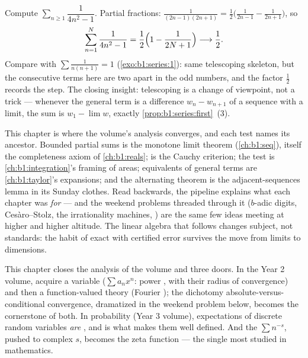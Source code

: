 \begin{example}\label{ex:b1:series:oddtelescope}
Compute $\sum_{n \geq 1} \dfrac{1}{4n^2 - 1}$. Partial
fractions: $\frac{1}{(2n-1)(2n+1)} =
\frac12\bigl(\frac{1}{2n-1} - \frac{1}{2n+1}\bigr)$, so
\[
\sum_{n=1}^{N} \frac{1}{4n^2 - 1}
= \frac12\Bigl(1 - \frac{1}{2N+1}\Bigr)
\longrightarrow \frac12 .
\]
Compare with $\sum \frac{1}{n(n+1)} = 1$
(\cref{exo:b1:series:1}): same telescoping skeleton, but the
consecutive terms here are two apart in the odd numbers, and
the factor $\frac12$ records the step. The closing insight:
telescoping is a change of viewpoint, not a trick --- whenever
the general term is a difference $w_n - w_{n+1}$ of a sequence
with a limit, the sum is $w_1 - \lim w$, exactly
\cref{prop:b1:series:first}~(3).
\end{example}

\begin{remark}
This chapter is where the volume's analysis converges, and each
test names its ancestor. Bounded partial sums is the monotone
limit theorem (\cref{ch:b1:seq}), itself the completeness axiom
of \cref{ch:b1:reals};  is the Cauchy
criterion; the  test is \cref{ch:b1:integration}'s
framing of areas; equivalents of general terms are
\cref{ch:b1:taylor}'s expansions; and the alternating theorem is
the adjacent-sequences lemma in its Sunday clothes. Read
backwards, the pipeline explains what each chapter was
\emph{for} --- and the weekend problems threaded through it
($b$-adic digits, Ces\`aro--Stolz, the irrationality machines,
) are the same few ideas meeting at higher and
higher altitude. The linear algebra that follows changes
subject, not standards: the habit of exact  with
certified error survives the move from limits to dimensions.
\end{remark}

\begin{remark}
This chapter closes the analysis of the volume and  three
doors. In the Year 2 volume,  acquire a variable ($\sum
a_n x^n$: power , with their radius of convergence) and
then a function-valued theory (Fourier ); the dichotomy
absolute-versus-conditional convergence, dramatized in the
weekend problem below, becomes the cornerstone of both. In
probability (Year 3 volume), expectations of discrete random
variables \emph{are} , and  is what
makes them well defined. And the  $\sum n^{-s}$,
pushed to complex $s$, becomes the zeta function --- the single
most studied  in mathematics.
\end{remark}

